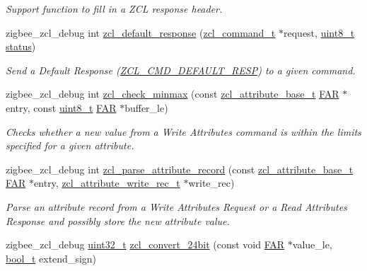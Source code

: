 \begin{DoxyCompactItemize}
\begin{DoxyCompactList}\small\item\em Support function to fill in a Z\+CL response header. \end{DoxyCompactList}\item 
zigbee\+\_\+zcl\+\_\+debug int \hyperlink{group__zcl_gab5c99acba0d864acd326bcab46d1416e}{zcl\+\_\+default\+\_\+response} (\hyperlink{structzcl__command__t}{zcl\+\_\+command\+\_\+t} $\ast$request, \hyperlink{group__hal__dos_gae1affc9ca37cfb624959c866a73f83c2}{uint8\+\_\+t} \hyperlink{group__xbee__atcmd_gade818037fd6c985038ff29656089758d}{status})
\begin{DoxyCompactList}\small\item\em Send a Default Response (\hyperlink{group__zcl_ga92499f538455b8d5a525510fba54adb2}{Z\+C\+L\+\_\+\+C\+M\+D\+\_\+\+D\+E\+F\+A\+U\+L\+T\+\_\+\+R\+E\+SP}) to a given command. \end{DoxyCompactList}\item 
zigbee\+\_\+zcl\+\_\+debug int \hyperlink{group__zcl_ga87ee4a8117e0420786a109b1f590ddc5}{zcl\+\_\+check\+\_\+minmax} (const \hyperlink{structzcl__attribute__base__t}{zcl\+\_\+attribute\+\_\+base\+\_\+t} \hyperlink{group__hal_gaef060b3456fdcc093a7210a762d5f2ed}{F\+AR} $\ast$entry, const \hyperlink{group__hal__dos_gae1affc9ca37cfb624959c866a73f83c2}{uint8\+\_\+t} \hyperlink{group__hal_gaef060b3456fdcc093a7210a762d5f2ed}{F\+AR} $\ast$buffer\+\_\+le)
\begin{DoxyCompactList}\small\item\em Checks whether a new value from a Write Attributes command is within the limits specified for a given attribute. \end{DoxyCompactList}\item 
zigbee\+\_\+zcl\+\_\+debug int \hyperlink{group__zcl_ga9f9ac99001185554fe24dc7b09c0b0b0}{zcl\+\_\+parse\+\_\+attribute\+\_\+record} (const \hyperlink{structzcl__attribute__base__t}{zcl\+\_\+attribute\+\_\+base\+\_\+t} \hyperlink{group__hal_gaef060b3456fdcc093a7210a762d5f2ed}{F\+AR} $\ast$entry, \hyperlink{structzcl__attribute__write__rec__t}{zcl\+\_\+attribute\+\_\+write\+\_\+rec\+\_\+t} $\ast$write\+\_\+rec)
\begin{DoxyCompactList}\small\item\em Parse an attribute record from a Write Attributes Request or a Read Attributes Response and possibly store the new attribute value. \end{DoxyCompactList}\item 
zigbee\+\_\+zcl\+\_\+debug \hyperlink{group__hal__dos_ga09a1e304d66d35dd47daffee9731edaa}{uint32\+\_\+t} \hyperlink{group__zcl_ga405e1c70b6278aae3a307971433c9229}{zcl\+\_\+convert\+\_\+24bit} (const void \hyperlink{group__hal_gaef060b3456fdcc093a7210a762d5f2ed}{F\+AR} $\ast$value\+\_\+le, \hyperlink{group__hal__dos_ga04dd5074964518403bf944f2b240a5f8}{bool\+\_\+t} extend\+\_\+sign)

\end{DoxyCompactItemize}
